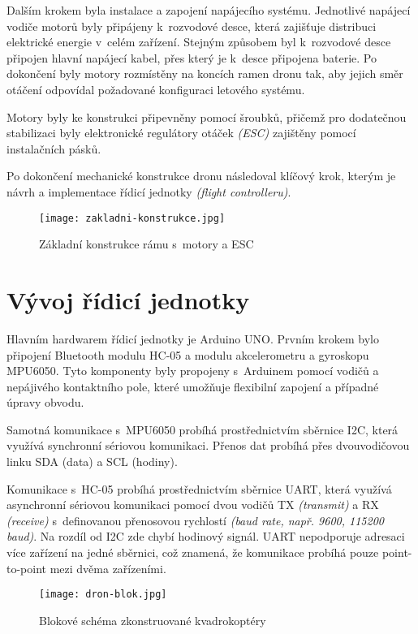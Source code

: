 \documentclass[12pt]{report}
\begin{document}
Dalším krokem byla instalace a zapojení napájecího systému. Jednotlivé napájecí vodiče motorů byly připájeny k~rozvodové desce, která zajišťuje distribuci elektrické energie v~celém zařízení. Stejným způsobem byl k~rozvodové desce připojen hlavní napájecí kabel, přes který je k~desce připojena baterie. Po dokončení byly motory rozmístěny na koncích ramen dronu tak, aby jejich směr otáčení odpovídal požadované konfiguraci letového systému.

Motory byly ke konstrukci připevněny pomocí šroubků, přičemž pro dodatečnou stabilizaci byly elektronické regulátory otáček \textit{(ESC)} zajištěny pomocí instalačních pásků.

Po dokončení mechanické konstrukce dronu následoval klíčový krok, kterým je návrh a implementace řídicí jednotky \textit{(flight controlleru)}.

\begin{figure}[H]
	\centering
	\texttt{[image: zakladni-konstrukce.jpg]}
	\caption{Základní konstrukce rámu s~motory a ESC}
	\label{fig:zakladni-konstrukce.jpg}
\end{figure}

\chapter[Vývoj řídicí jednotky]{Vývoj řídicí jednotky}
Hlavním hardwarem řídicí jednotky je Arduino UNO. Prvním krokem bylo připojení Bluetooth modulu HC-05 a modulu akcelerometru a gyroskopu MPU6050. Tyto komponenty byly propojeny s~Arduinem pomocí vodičů a nepájivého kontaktního pole, které umožňuje flexibilní zapojení a případné úpravy obvodu.

Samotná komunikace s~MPU6050 probíhá prostřednictvím sběrnice I2C, která využívá synchronní sériovou komunikaci. Přenos dat probíhá přes dvouvodičovou linku SDA (data) a SCL (hodiny). \cite{i2c}

Komunikace s~HC-05 probíhá prostřednictvím sběrnice UART, která využívá asynchronní sériovou komunikaci pomocí dvou vodičů TX \textit{(transmit)} a RX \textit{(receive)} s~definovanou přenosovou rychlostí \textit{(baud rate, např. 9600, 115200 baud)}. Na rozdíl od I2C zde chybí hodinový signál. UART nepodporuje adresaci více zařízení na jedné sběrnici, což znamená, že komunikace probíhá pouze point-to-point mezi dvěma zařízeními. \cite{uart}

\begin{figure}[H]
	\centering
	\texttt{[image: dron-blok.jpg]}
	\caption{Blokové schéma zkonstruované kvadrokoptéry}
	\label{fig:dron-blok.jpg}
\end{figure}
\end{document}
